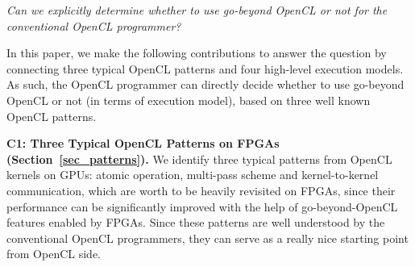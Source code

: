 \vspace{0.4em}
{\em Can we explicitly determine whether to use go-beyond OpenCL or not for the conventional OpenCL programmer?}
\vspace{0.4em}

In this paper, we make the following contributions to answer the question by connecting three typical OpenCL patterns and four high-level execution models. As such, the OpenCL programmer can directly decide whether to use go-beyond OpenCL or not (in terms of execution model), based on three well known OpenCL patterns. %


\vspace{0.4em}
\noindent
{\bf C1: Three Typical OpenCL Patterns on FPGAs (Section~\ref{sec_patterns}). }We identify three typical patterns from OpenCL kernels on GPUs: atomic operation, multi-pass scheme and kernel-to-kernel communication, which are worth to be heavily revisited on FPGAs, since their performance can be significantly improved with the help of go-beyond-OpenCL features enabled by FPGAs. Since these patterns are well understood by the conventional OpenCL programmers, they can serve as a really nice starting point from OpenCL side. %


